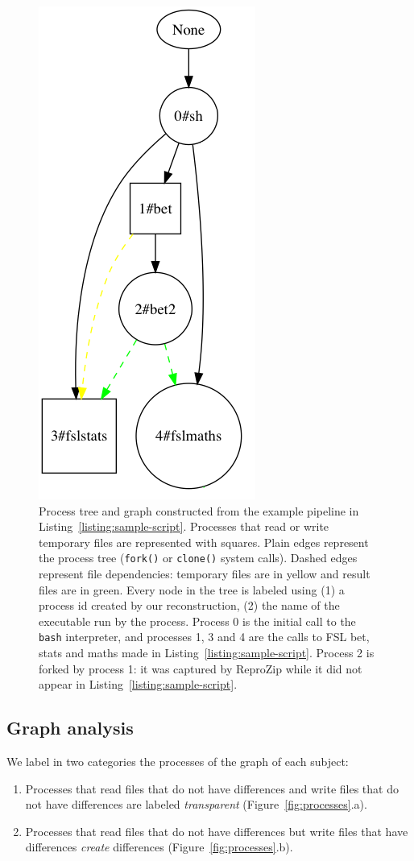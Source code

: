 \documentclass[a4paper,num-refs]{oup-contemporary}
\newcommand{\reprozip}[0]{ReproZip\xspace}
\begin{document}
\begin{figure}
\centering
  \includegraphics[width=0.3\columnwidth]{images/simple_graph}
  \caption{Process tree and graph
  constructed from the example pipeline in
  Listing~\ref{listing:sample-script}.
  Processes that read or write
  temporary files are 
  represented with squares. Plain edges 
  represent the process tree (\texttt{fork()} or \texttt{clone()} 
  system calls). Dashed edges represent file dependencies: temporary 
  files are in yellow and result files are in green.
  Every node in the tree is labeled using (1) a process id created by our
  reconstruction, (2) the name of the executable run by the process.
  Process 0 is the initial call to the \texttt{bash} interpreter, and
  processes 1, 3 and 4 are the calls to FSL bet, stats and maths made in
  Listing~\ref{listing:sample-script}. Process 2 is forked by process 1: it
  was captured by \reprozip while it did not appear in
  Listing~\ref{listing:sample-script}. 
}
  \label{fig:simple_script}
\end{figure}


\subsection{Graph analysis}

We label in two categories the processes of the graph of each subject:
\begin{enumerate}
\item Processes that read files that do not have differences and write files that do not have differences 
are labeled \emph{transparent} (Figure~\ref{fig:processes}.a).
\item Processes that read files 
that do not have differences but write files that have differences 
\emph{create} differences (Figure~\ref{fig:processes}.b).
\end{enumerate}
\end{document}
